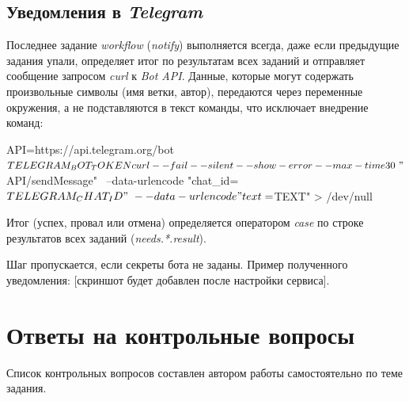 \documentclass{stp}
\newcommand{\en}[1]{\textit{#1}}
\newcommand{\pending}{[скриншот будет добавлен после настройки сервиса]}
\begin{document}
\subsection{Уведомления в \en{Telegram}}

Последнее задание \en{workflow} (\en{notify}) выполняется всегда, даже если
предыдущие задания упали, определяет итог по результатам всех заданий и
отправляет сообщение запросом \en{curl} к \en{Bot API}. Данные, которые могут
содержать произвольные символы (имя ветки, автор), передаются через переменные
окружения, а не подставляются в текст команды, что исключает внедрение команд:

\begin{stplisting}
API=https://api.telegram.org/bot${TELEGRAM_BOT_TOKEN}
curl --fail --silent --show-error --max-time 30 \
  "${API}/sendMessage" \
  --data-urlencode "chat_id=${TELEGRAM_CHAT_ID}" \
  --data-urlencode "text=${TEXT}" > /dev/null
\end{stplisting}

Итог (успех, провал или отмена) определяется оператором \en{case} по
строке результатов всех заданий (\en{needs.*.result}).

Шаг пропускается, если секреты бота не заданы. Пример полученного
уведомления: \pending.

\section{Ответы на контрольные вопросы}

Список контрольных вопросов составлен автором работы самостоятельно по теме
задания.
\end{document}
